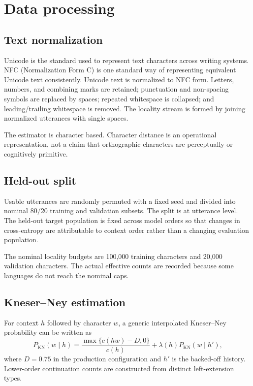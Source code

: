 \documentclass[11pt]{article}
\begin{document}
\begin{table}[H]\centering
\caption{Languages with missing morphology index in the current result.}\label{tab:missing}
\small

\end{table}

\section{Data processing}
\subsection{Text normalization}
Unicode is the standard used to represent text characters across writing systems. NFC (Normalization Form C) is one standard way of representing equivalent Unicode text consistently. Unicode text is normalized to NFC form. Letters, numbers, and combining marks are retained; punctuation and non-spacing symbols are replaced by spaces; repeated whitespace is collapsed; and leading/trailing whitespace is removed. The locality stream is formed by joining normalized utterances with single spaces.

The estimator is character based. Character distance is an operational representation, not a claim that orthographic characters are perceptually or cognitively primitive.

\subsection{Held-out split}
Usable utterances are randomly permuted with a fixed seed and divided into nominal 80/20 training and validation subsets. The split is at utterance level. The held-out target population is fixed across model orders so that changes in cross-entropy are attributable to context order rather than a changing evaluation population.

The nominal locality budgets are 100,000 training characters and 20,000 validation characters. The actual effective counts are recorded because some languages do not reach the nominal caps.

\subsection{Kneser--Ney estimation}
For context $h$ followed by character $w$, a generic interpolated Kneser--Ney probability can be written as
\[
P_{\mathrm{KN}}(w\mid h)=
\frac{\max\{c(hw)-D,0\}}{c(h)}+\lambda(h)P_{\mathrm{KN}}(w\mid h'),
\]
where $D=0.75$ in the production configuration and $h'$ is the backed-off history. Lower-order continuation counts are constructed from distinct left-extension types.
\end{document}
